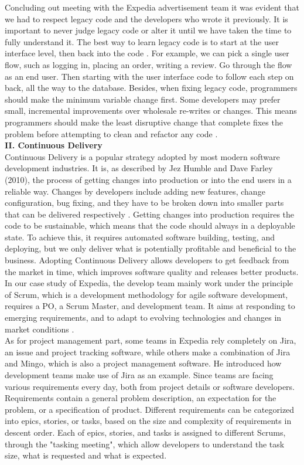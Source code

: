 \documentclass[11pt]{article}
\begin{document}
Concluding out meeting with the Expedia advertisement team it was evident that we had to respect legacy code and the developers who wrote it previously. It is important to never judge legacy code or alter it until we have taken the time to fully understand it. The best way to learn legacy code is to start at the user interface level, then back into the code \cite{no4}. For example, we can pick a single user flow, such as logging in, placing an order, writing a review. Go through the flow as an end user. Then starting with the user interface code to follow each step on back, all the way to the database. Besides, when fixing legacy code, programmers should make the minimum variable change \cite{no4} first. Some developers may prefer small, incremental improvements over wholesale re-writes or changes. This means programmers should make the least disruptive change that complete fixes the problem before attempting to clean and refactor any code \cite{no4}. \\[10px]
{\bf II. Continuous Delivery}\\[10px]
Continuous Delivery is a popular strategy adopted by most modern software development industries. It is, as described by Jez Humble and Dave Farley (2010), the process of getting changes into production or into the end users in a reliable way. Changes by developers include adding new features, change configuration, bug fixing, and they have to be broken down into smaller parts that can be delivered respectively \cite{no5}. Getting changes into production requires the code to be sustainable, which means that the code should always in a deployable state. To achieve this, it requires automated software building, testing, and deploying, but we only deliver what is potentially profitable and beneficial to the business. Adopting Continuous Delivery allows developers to get feedback from the market in time, which improves software quality and releases better products. \\[10px]
In our case study of Expedia, the develop team mainly work under the principle of Scrum, which is a development methodology for agile software development, requires a PO, a Scrum Master, and development team. It aims at responding to emerging requirements, and to adapt to evolving technologies and changes in market conditions \cite{no6}. \\[10px]
As for project management part, some teams in Expedia rely completely on Jira, an issue and project tracking software, while others make a combination of Jira and Mingo, which is also a project management software. He introduced how development teams make use of Jira as an example. Since teams are facing various requirements every day, both from project details or software developers. Requirements contain a general problem description, an expectation for the problem, or a specification of product. Different requirements can be categorized into epics, stories, or tasks, based on the size and complexity of requirements in descent order. Each of epics, stories, and tasks is assigned to different Scrums, through the "tasking meeting", which allow developers to understand the task size, what is requested and what is expected. \\[10px]
\end{document}
